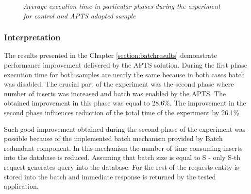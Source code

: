 \documentclass[12pt,a4paper]{article}
\begin{document}
\mydata
\begin{figure}[!htb]
\centering
{}
\caption{\textit{Average execution time in particular phases during the experiment for control and APTS adapted sample}} \label{batchEvalResutlsGraph}
\end{figure}

\subsubsection{Interpretation} 

The results presented in the Chapter \ref{section:batchresults} demonstrate performance improvement delivered by the APTS solution. During the first phase execution time for both samples are nearly the same because in both cases batch was disabled. The crucial part of the experiment was the second phase where number of inserts was increased and batch was enabled by the APTS. The obtained improvement in this phase was equal to 28.6\%. The improvement in the second phase influences reduction of the total time of the experiment by 26.1\%. 

Such good improvement obtained during the second phase of the experiment was possible because of the implemented batch mechanism provided by Batch redundant component. In this mechanism the number of time consuming inserts into the database is reduced. Assuming that batch size is equal to S - only S-th request generates query into the database. For the rest of the requests entity is stored into the batch and immediate response is returned by the tested application. 
\end{document}
